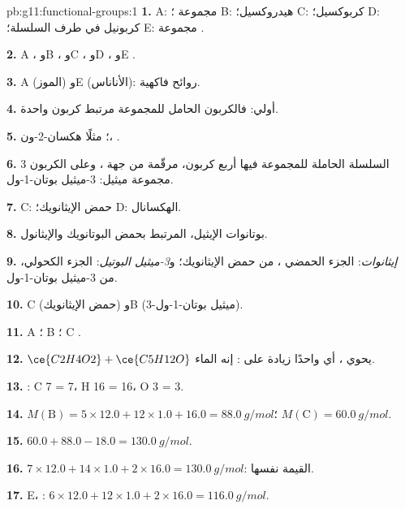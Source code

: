 \begin{solution}{pb:g11:functional-groups:1}
\textbf{1.} A: مجموعة ؛ B: هيدروكسيل؛ C: كربوكسيل؛ D: كربونيل في
طرف السلسلة؛ E: مجموعة .

\textbf{2.} A ، وB ، وC ، وD ، وE .

\textbf{3.} A (الموز) وE (الأناناس): روائح فاكهية.

\textbf{4.} أولي: فالكربون الحامل للمجموعة  مرتبط  كربون واحدة.

\textbf{5.} ؛ مثلًا هكسان-2-ون،
.

\textbf{6.} السلسلة الحاملة للمجموعة  فيها أربع  كربون، مرقّمة
من جهة ، وعلى الكربون 3 مجموعة ميثيل: 3-ميثيل بوتان-1-ول.

\textbf{7.} C: حمض الإيثانويك؛ D: الهكسانال.

\textbf{8.} بوتانوات الإيثيل، المرتبط بحمض البوتانويك والإيثانول.

\textbf{9.} \emph{إيثانوات}: الجزء الحمضي ، من حمض
الإيثانويك؛ و\emph{3-ميثيل البوتيل}: الجزء الكحولي، من 3-ميثيل بوتان-1-ول.

\textbf{10.} C (حمض الإيثانويك) وB (3-ميثيل بوتان-1-ول).

\textbf{11.} A ؛ B ؛ C .

\textbf{12.} $\ce{C2H4O2} + \ce{C5H12O}$ يحوي ، أي
 واحدًا زيادة على : إنه الماء.

\textbf{13.} : C 7 = 7، H 16 = 16،
O 3 = 3.

\textbf{14.} $M(\text{B}) = 5 \times 12.0 + 12 \times 1.0 + 16.0 =
\qty{88.0}{g/mol}$؛ $M(\text{C}) = \qty{60.0}{g/mol}$.

\textbf{15.} $60.0 + 88.0 - 18.0 = \qty{130.0}{g/mol}$.

\textbf{16.} $7 \times 12.0 + 14 \times 1.0 + 2 \times 16.0 =
\qty{130.0}{g/mol}$: القيمة نفسها.

\textbf{17.} E، : $6 \times 12.0 + 12 \times 1.0 + 2 \times
16.0 = \qty{116.0}{g/mol}$.


\end{solution}
